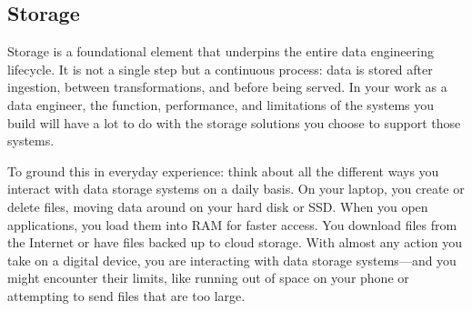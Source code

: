 \documentclass{article}
\begin{document}
\subsection{Storage}
Storage is a foundational element that underpins the entire data engineering lifecycle. It is not a single step but a continuous process: data is stored after ingestion, between transformations, and before being served. In your work as a data engineer, the function, performance, and limitations of the systems you build will have a lot to do with the storage solutions you choose to support those systems.

To ground this in everyday experience: think about all the different ways you interact with data storage systems on a daily basis. On your laptop, you create or delete files, moving data around on your hard disk or SSD. When you open applications, you load them into RAM for faster access. You download files from the Internet or have files backed up to cloud storage. With almost any action you take on a digital device, you are interacting with data storage systems---and you might encounter their limits, like running out of space on your phone or attempting to send files that are too large.
\end{document}
